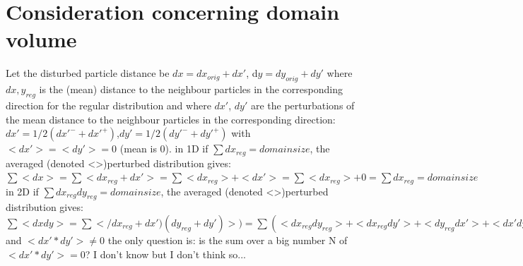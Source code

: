 \documentclass{report}
\begin{document}
\appendix
\appendixpage
\addappheadtotoc

\chapter{Consideration concerning domain volume}
 Let the disturbed particle distance be $dx=dx_{\mathit{orig}}+dx'$, d$y=dy_{\mathit{orig}}+dy'$ where $dx,y_{\mathit{reg}}$ is the (mean) distance to the neighbour particles in the corresponding direction for the regular distribution
 and where $dx'$, $dy'$ are the perturbations of the mean distance to the neighbour particles in the corresponding direction:
 $dx'=1/2(dx'^-+dx'^+)$,$dy'=1/2(dy'^-+dy'^+)$ with $<dx'>=<dy'>=0$ (mean is 0).
 in 1D if $\sum dx_{\mathit{reg}}=domainsize$, the averaged (denoted <>)perturbed distribution gives: $\sum <dx>=\sum <dx_{\mathit{reg}}+dx'>=\sum <dx_{\mathit{reg}}>+<dx'>=\sum<dx_{\mathit{reg}}>+0=\sum dx_{\mathit{reg}}=domainsize$
 in 2D if $\sum dx_{\mathit{reg}}dy_{\mathit{reg}}=domainsize$, the averaged (denoted <>)perturbed distribution gives:    $\sum <dxdy>=\sum </dx_{\mathit{reg}}+dx')(dy_{\mathit{reg}}+dy')>)=\sum (<dx_{\mathit{reg}}dy_{\mathit{reg}}>+<dx_{\mathit{reg}}dy'>+<dy_{\mathit{reg}}dx'>+<dx'dy>)=\sum (dx_{\mathit{reg}}dy_{\mathit{reg}})+\sum (<dx'dy'>)=domainsize+sum(<dx'dy'>)$
 and $<dx'*dy'>\neq0$ the only question is: is the sum over a big number N of $<dx'*dy'> =0$? I don't know but I don't think so...
\end{document}
